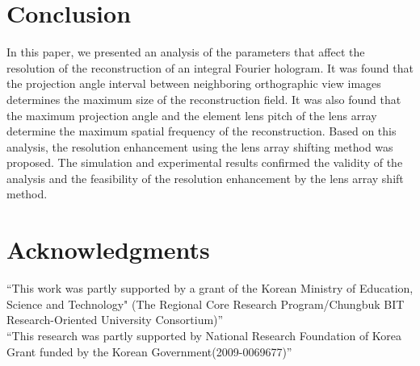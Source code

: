 \documentclass[10pt,letterpaper]{article}
\begin{document}
\section{Conclusion}
In this paper, we presented an analysis of the parameters that affect the resolution of the reconstruction of an integral Fourier hologram. It was found that the projection angle interval between neighboring orthographic view images determines the maximum size of the reconstruction field. It was also found that the maximum projection angle and the element lens pitch of the lens array determine the maximum spatial frequency of the reconstruction. Based on this analysis, the resolution enhancement using the lens array shifting method was proposed. The simulation and experimental results confirmed the validity of the analysis and the feasibility of the resolution enhancement by the lens array shift method. 

\section*{Acknowledgments} 
``This work was partly supported by a grant of the Korean Ministry of Education, Science and Technology" (The Regional Core Research Program/Chungbuk BIT Research-Oriented University Consortium)''\\

\noindent ``This research was partly supported by National Research Foundation of Korea Grant funded by the Korean Government(2009-0069677)''
\end{document}
